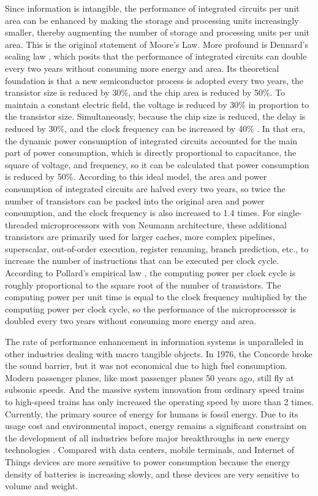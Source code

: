 Since information is intangible, the performance of integrated circuits per unit area can be enhanced by making the storage and processing units increasingly smaller, thereby augmenting the number of storage and processing units per unit area. This is the original statement of Moore's Law.
More profound is Dennard's scaling law \cite{dennard1974design}, which posits that the performance of integrated circuits can double every two years without consuming more energy and area.
Its theoretical foundation is that a new semiconductor process is adopted every two years, the transistor size is reduced by 30\%, and the chip area is reduced by 50\%. To maintain a constant electric field, the voltage is reduced by 30\% in proportion to the transistor size. Simultaneously, because the chip size is reduced, the delay is reduced by 30\%, and the clock frequency can be increased by 40\% \cite{borkar1999design,borkar2011future}.
In that era, the dynamic power consumption of integrated circuits accounted for the main part of power consumption, which is directly proportional to capacitance, the square of voltage, and frequency, so it can be calculated that power consumption is reduced by 50\%.
According to this ideal model, the area and power consumption of integrated circuits are halved every two years, so twice the number of transistors can be packed into the original area and power consumption, and the clock frequency is also increased to 1.4 times.
For single-threaded microprocessors with von Neumann architecture, these additional transistors are primarily used for larger caches, more complex pipelines, superscalar, out-of-order execution, register renaming, branch prediction, etc., to increase the number of instructions that can be executed per clock cycle.
According to Pollard's empirical law \cite{pollackpollack}, the computing power per clock cycle is roughly proportional to the square root of the number of transistors.
The computing power per unit time is equal to the clock frequency multiplied by the computing power per clock cycle, so the performance of the microprocessor is doubled every two years without consuming more energy and area.

The rate of performance enhancement in information systems is unparalleled in other industries dealing with macro tangible objects. In 1976, the Concorde broke the sound barrier, but it was not economical due to high fuel consumption. Modern passenger planes, like most passenger planes 50 years ago, still fly at subsonic speeds. And the massive system innovation from ordinary speed trains to high-speed trains has only increased the operating speed by more than 2 times. Currently, the primary source of energy for humans is fossil energy. Due to its usage cost and environmental impact, energy remains a significant constraint on the development of all industries before major breakthroughs in new energy technologies \cite{energy}. Compared with data centers, mobile terminals, and Internet of Things devices are more sensitive to power consumption because the energy density of batteries is increasing slowly, and these devices are very sensitive to volume and weight.

